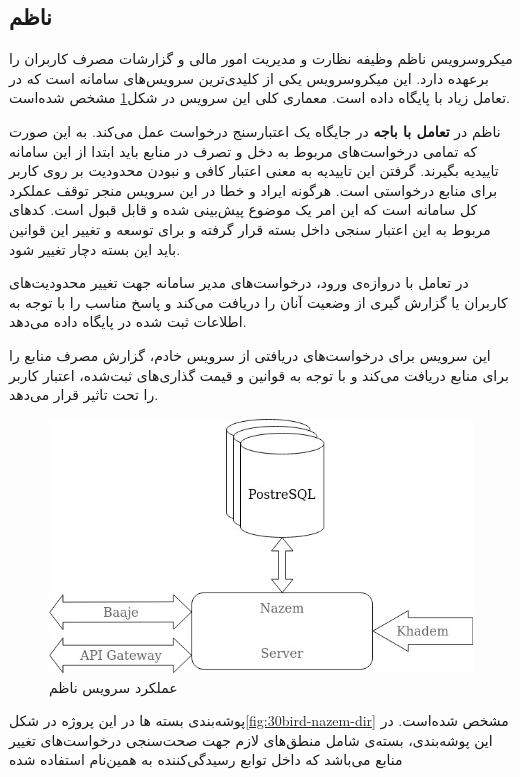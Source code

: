 \subsection{ناظم}
میکروسرویس ناظم وظیفه نظارت و مدیریت امور مالی و گزارشات مصرف کاربران را برعهده دارد. این میکروسرویس یکی از کلیدی‌ترین سرویس‌های سامانه است که در تعامل زیاد با پایگاه داده است. معماری کلی این سرویس در شکل\ref{fig:30bird-nazem} مشخص شده‌است.

ناظم در \textbf{تعامل با باجه} در جایگاه یک اعتبارسنج درخواست عمل می‌کند. به این صورت که تمامی درخواست‌های مربوط به دخل و تصرف در منابع باید ابتدا از این سامانه تاییدیه بگیرند. گرفتن این تاییدیه به معنی اعتبار کافی و نبودن محدودیت بر روی کاربر برای منابع درخواستی است. هرگونه ایراد و خطا در این سرویس منجر توقف عملکرد کل سامانه است که این امر یک موضوع پیش‌بینی شده و قابل قبول است. کد‌های مربوط به این اعتبار سنجی داخل بسته  قرار گرفته و برای توسعه و تغییر این قوانین باید این بسته دچار تغییر شود.

در تعامل با ‌دروازه‌ی ورود، درخواست‌های مدیر سامانه جهت تغییر محدودیت‌های کاربران یا گزارش گیری از وضعیت آنان را دریافت می‌کند و پاسخ مناسب را با توجه به اطلاعات ثبت شده در پایگاه داده می‌دهد.

این سرویس برای درخواست‌های دریافتی از سرویس خادم، گزارش مصرف منابع را برای منابع دریافت می‌کند و با توجه به قوانین و قیمت گذاری‌های ثبت‌شده، اعتبار کاربر را تحت تاثیر قرار می‌دهد.

\begin{figure}
	\vspace{1cm}
	\centering
	\includegraphics[scale=0.7]{figures/30bird-nazem.jpg}
	\caption{عملکرد سرویس ناظم}
	\label{fig:30bird-nazem}
\end{figure}

پوشه‌بندی بسته ها در این پروژه در شکل\ref{fig:30bird-nazem-dir} مشخص شده‌است. در این پوشه‌بندی، بسته‌ی  شامل منطق‌های لازم جهت صحت‌سنجی درخواست‌های تغییر منابع می‌باشد که داخل توابع رسیدگی‌کننده به همین‌نام استفاده شده

